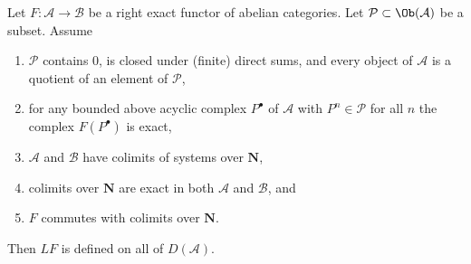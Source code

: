 \begin{proposition}
\label{proposition-left-derived-exists}
Let $F : \mathcal{A} \to \mathcal{B}$ be a right exact functor
of abelian categories. Let $\mathcal{P} \subset \Ob(\mathcal{A})$ be a
subset. Assume
\begin{enumerate}
\item $\mathcal{P}$ contains $0$, is closed under (finite) direct sums,
and every object of $\mathcal{A}$ is a quotient of an
element of $\mathcal{P}$,
\item for any bounded above acyclic complex $P^\bullet$ of
$\mathcal{A}$ with $P^n \in \mathcal{P}$ for all $n$ the
complex $F(P^\bullet)$ is exact,
\item $\mathcal{A}$ and $\mathcal{B}$ have colimits
of systems over $\mathbf{N}$,
\item colimits over $\mathbf{N}$ are exact in both
$\mathcal{A}$ and $\mathcal{B}$, and
\item $F$ commutes with colimits over $\mathbf{N}$.
\end{enumerate}
Then $LF$ is defined on all of $D(\mathcal{A})$.
\end{proposition}


